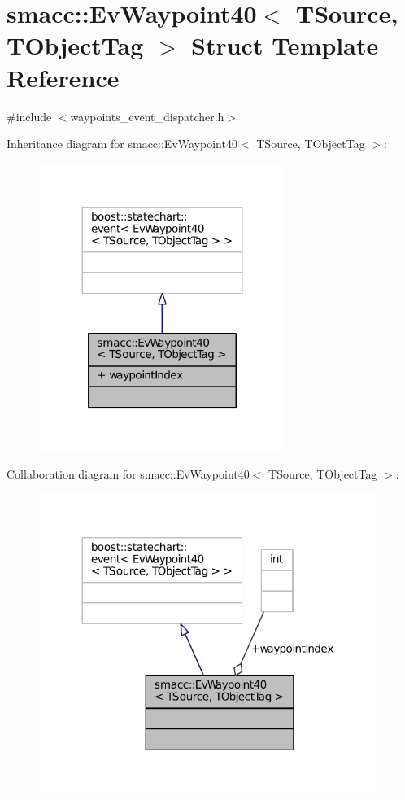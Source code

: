 \hypertarget{structsmacc_1_1EvWaypoint40}{}\section{smacc\+:\+:Ev\+Waypoint40$<$ T\+Source, T\+Object\+Tag $>$ Struct Template Reference}
\label{structsmacc_1_1EvWaypoint40}


{\ttfamily \#include $<$waypoints\+\_\+event\+\_\+dispatcher.\+h$>$}



Inheritance diagram for smacc\+:\+:Ev\+Waypoint40$<$ T\+Source, T\+Object\+Tag $>$\+:
\nopagebreak
\begin{figure}[H]
\begin{center}
\leavevmode
\includegraphics[width=227pt]{structsmacc_1_1EvWaypoint40__inherit__graph}
\end{center}
\end{figure}


Collaboration diagram for smacc\+:\+:Ev\+Waypoint40$<$ T\+Source, T\+Object\+Tag $>$\+:
\nopagebreak
\begin{figure}[H]
\begin{center}
\leavevmode
\includegraphics[width=312pt]{structsmacc_1_1EvWaypoint40__coll__graph}
\end{center}
\end{figure}
